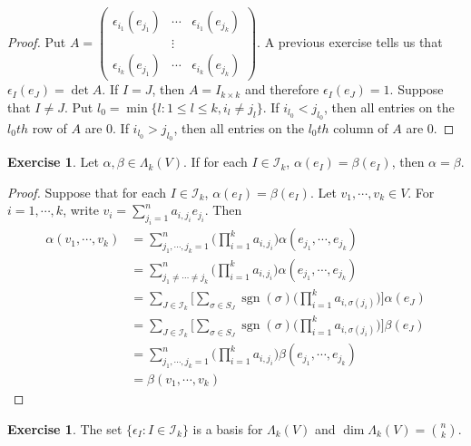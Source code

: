 \documentclass[12pt]{amsart}
\theoremstyle{definition}
\theoremstyle{remark}
\theoremstyle{definition}
\newtheorem{ex}[definition]{Exercise}
\newcommand{\al}{\alpha}
\newcommand{\bet}{\beta}
\newcommand{\Lam}{\Lambda}
\newcommand{\ep}{\epsilon}
\newcommand{\sig}{\sigma}
\newcommand{\MI}{\mathcal{I}}
\DeclareMathOperator{\sgn}{sgn}
\begin{document}
	\begin{proof}
		Put $A = \begin{pmatrix}
			\ep_{i_1}(e_{j_1}) & \cdots & \ep_{i_1}(e_{j_k}) \\
			& \vdots & \\
			\ep_{i_k}(e_{j_1}) & \cdots & \ep_{i_k}(e_{j_k}) 
		\end{pmatrix}$.
		A previous exercise tells us that $\ep_I(e_J) = \det A$.
		If $I = J$, then $A = I_{k\times k}$ and therefore $\ep_I(e_J) = 1$. Suppose that $I \neq J$. Put $l_0 = \min \{l: 1 \leq l \leq k, i_l \neq j_l\}$. If $i_{l_0} < j_{l_0}$, then all entries on the $l_0th$ row of $A$ are $0$. If $i_{l_0} > j_{l_0}$, then all entries on the $l_0th$ column of $A$ are $0$.
	\end{proof}

	\begin{ex}
		Let $\al , \bet \in \Lam_k(V)$. If for each $I \in \MI_k$, $\al(e_I) = \bet(e_I)$, then $\al = \bet$.
	\end{ex}

	\begin{proof}
		Suppose that for each $I \in \MI_k$, $\al(e_I) = \bet(e_I)$. Let $v_1, \cdots, v_k \in V$. For $i = 1, \cdots, k$, write $v_i = \sum_{j_i = 1}^n a_{i,j_i}e_{j_i}$. Then 
		\begin{align*}
			\al(v_1, \cdots, v_k) 
			&= \sum_{j_1, \cdots, j_k =1}^n \bigg( \prod_{i=1}^k a_{i, j_i} \bigg) \al(e_{j_1}, \cdots, e_{j_k}) \\
			&= \sum_{j_1 \neq \cdots \neq j_k}^n \bigg( \prod_{i=1}^k a_{i, j_i} \bigg) \al(e_{j_1}, \cdots, e_{j_k}) \\
			&= \sum_{J \in \MI_k} \bigg [ \sum_{\sig \in S_J} \sgn(\sig) \bigg( \prod_{i=1}^k a_{i, \sig(j_i)} \bigg) \bigg] \al(e_J) \\
			&= \sum_{J \in \MI_k} \bigg [ \sum_{\sig \in S_J} \sgn(\sig) \bigg( \prod_{i=1}^k a_{i, \sig(j_i)} \bigg) \bigg] \bet(e_J) \\
			&= \sum_{j_1, \cdots, j_k =1}^n \bigg( \prod_{i=1}^k a_{i, j_i} \bigg) \bet(e_{j_1}, \cdots, e_{j_k}) \\
			&= \bet(v_1, \cdots, v_k) 
		\end{align*}
	
	\end{proof}

	\begin{ex}
		The set $\{\ep_I: I \in \MI_k\}$ is a basis for $\Lam_k(V)$ and $\dim \Lam_k(V) = {n \choose k}$.
	\end{ex}
\end{document}

